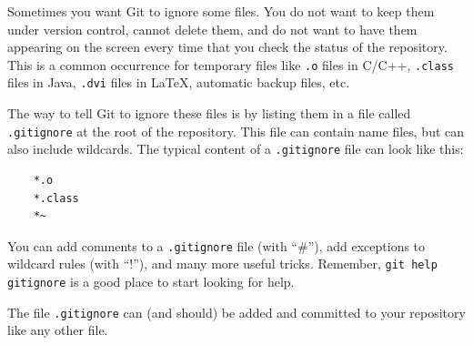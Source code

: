 Sometimes you want Git to ignore some files. You do not want to keep
them under version control, cannot delete them, and do not want to
have them appearing on the screen every time that you check the status
of the repository. This is a common occurrence for temporary files
like \verb+.o+ files in C/C++, \verb+.class+ files in Java,
\verb+.dvi+ files in \LaTeX, automatic backup files, etc.

The way to tell Git to ignore these files is by listing them in a file
called \verb+.gitignore+ at the root of the repository. This file can
contain name files, but can also include wildcards. The typical
content of a \verb+.gitignore+ file can look like this:

\begin{verbatim}
    *.o
    *.class
    *~
\end{verbatim}

You can add comments to a \verb+.gitignore+ file (with ``\#''), add
exceptions to wildcard rules (with ``!''), and many more useful
tricks. Remember, \verb+git help gitignore+ is a good place to start
looking for help. 

The file \verb+.gitignore+ can (and should) be added and 
committed to your repository like any other file.





